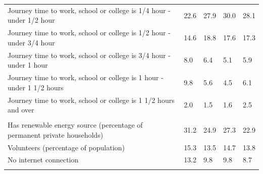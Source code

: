\documentclass{article}
\begin{document}
\begin{table}[h]
\begin{tabular}{KTTTT}
Journey time to work, school or college is 1/4 hour - under 1/2 hour & 22.6& 27.9& 30.0& 28.1\\
Journey time to work, school or college is 1/2 hour - under 3/4 hour & 14.6& 18.8& 17.6& 17.3\\
Journey time to work, school or college is 3/4 hour - under 1 hour & 8.0& 6.4& 5.1& 5.9\\
Journey time to work, school or college is 1 hour - under 1 1/2 hours & 9.8& 5.6& 4.5& 6.1\\
Journey time to work, school or college is 1 1/2 hours and over & 2.0& 1.5& 1.6& 2.5\\
\hline
    \\ 
    \hline
Has renewable energy source (percentage of permanent private households) & 31.2& 24.9& 27.3& 22.9\\
    \hline
Volunteers (percentage of population) & 15.3& 13.5& 14.7& 13.8\\
    \hline
No internet connection& 13.2&  9.8&  9.8&  8.7\\
\hline
\end{tabular}
\end{table}
\end{document}
